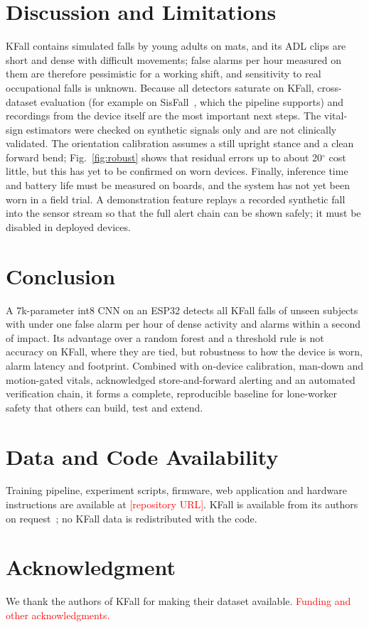 \documentclass[conference]{IEEEtran}
\newcommand{\tbd}[1]{\textcolor{red}{#1}}
\begin{document}
\section{Discussion and Limitations}
KFall contains simulated falls by young adults on mats, and its ADL clips are short and
dense with difficult movements; false alarms per hour measured on them are therefore
pessimistic for a working shift, and sensitivity to real occupational falls is unknown.
Because all detectors saturate on KFall, cross-dataset evaluation (for example on
SisFall~\cite{sucerquia2017sisfall}, which the pipeline supports) and recordings from the
device itself are the most important next steps. The vital-sign estimators were checked on
synthetic signals only and are not clinically validated. The orientation calibration
assumes a still upright stance and a clean forward bend; Fig.~\ref{fig:robust} shows
that residual errors up to about 20$^\circ$ cost little, but this has yet to be confirmed on worn
devices. Finally, inference time and
battery life must be measured on boards, and the system has not yet been worn in a field
trial. A demonstration feature replays a recorded synthetic fall into the sensor stream so
that the full alert chain can be shown safely; it must be disabled in deployed devices.

\section{Conclusion}
A 7k-parameter int8 CNN on an ESP32 detects all KFall falls of unseen subjects with under
one false alarm per hour of dense activity and alarms within a second of impact. Its
advantage over a random forest and a threshold rule is not accuracy on KFall, where they
are tied, but robustness to how the device is worn, alarm latency and footprint. Combined
with on-device calibration, man-down and motion-gated vitals, acknowledged store-and-forward
alerting and an automated verification chain, it forms a complete, reproducible baseline
for lone-worker safety that others can build, test and extend.

\section*{Data and Code Availability}
Training pipeline, experiment scripts, firmware, web application and hardware
instructions are available at \tbd{[repository URL]}. KFall is available from its authors
on request~\cite{yu2021kfall}; no KFall data is redistributed with the code.

\section*{Acknowledgment}
We thank the authors of KFall for making their dataset available. \tbd{Funding and other
acknowledgments.}



\end{document}
